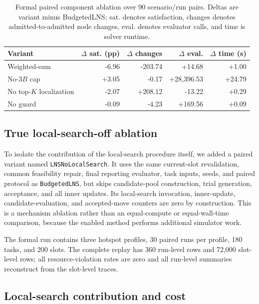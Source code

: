 \documentclass[preprint,12pt]{elsarticle}
\begin{document}
\begin{table}[H]
\centering
\caption{Formal paired component ablation over 90 scenario/run pairs. Deltas are variant minus BudgetedLNS; sat. denotes satisfaction, changes denotes admitted-to-admitted node changes, eval. denotes evaluator calls, and time is solver runtime.}
\label{tab:core-audit-ablation}
\scriptsize
\begin{tabular}{lrrrr}
\toprule
Variant & $\Delta$ sat. (pp) & $\Delta$ changes & $\Delta$ eval. & $\Delta$ time (s) \\
\midrule
Weighted-sum & -6.96 & -203.74 & +14.68 & +1.00 \\
No-$3B$ cap & +3.05 & -0.17 & +28,396.53 & +24.79 \\
No top-$K$ localization & -2.07 & +208.12 & -13.22 & +0.29 \\
No guard & -0.09 & -4.23 & +169.56 & +0.09 \\
\bottomrule
\end{tabular}
\end{table}

\subsection{True local-search-off ablation}
\label{local-search-off-ablation}

To isolate the contribution of the local-search procedure itself, we added a
paired variant named \texttt{LNSNoLocalSearch}. It uses the same current-slot
revalidation, common feasibility repair, final reporting evaluator, task
inputs, seeds, and paired protocol as \texttt{BudgetedLNS}, but skips candidate-pool
construction, trial generation, acceptance, and all inner updates. Its
local-search invocation, inner-update, candidate-evaluation, and accepted-move
counters are zero by construction. This is a mechanism ablation rather than
an equal-compute or equal-wall-time comparison, because the enabled method
performs additional simulator work.

The formal run contains three hotspot profiles, 30 paired runs per profile,
180 tasks, and 200 slots. The complete replay has 360 run-level rows and
72,000 slot-level rows; all resource-violation rates are zero and all
run-level summaries reconstruct from the slot-level traces.

\subsection{Local-search contribution and cost}
\label{local-search-results}
\end{document}
